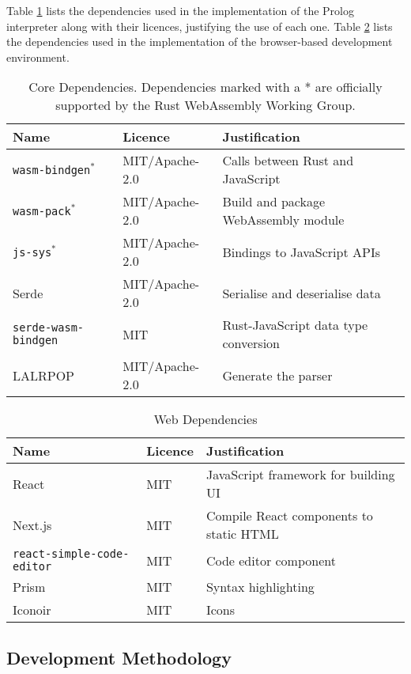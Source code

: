 Table \ref{tab:core-dependencies} lists the dependencies used in the implementation of the Prolog interpreter along with their licences, justifying the use of each one. Table \ref{tab:web-dependencies} lists the dependencies used in the implementation of the browser-based development environment.

\begin{table}[H]
\centering
\begin{tabular}{lll}
\hline
\textbf{Name} & \textbf{Licence} & \textbf{Justification} \\
\hline
\texttt{wasm-bindgen}$^*$ & MIT/Apache-2.0 & Calls between Rust and JavaScript \\
\texttt{wasm-pack}$^*$ & MIT/Apache-2.0 & Build and package WebAssembly module \\
\texttt{js-sys}$^*$ & MIT/Apache-2.0 & Bindings to JavaScript APIs \\
Serde & MIT/Apache-2.0 & Serialise and deserialise data \\
\texttt{serde-wasm-bindgen} & MIT & Rust-JavaScript data type conversion \\
LALRPOP & MIT/Apache-2.0 & Generate the parser \\
\hline
\end{tabular}
\caption{Core Dependencies. Dependencies marked with a * are officially supported by the Rust WebAssembly Working Group.}
\label{tab:core-dependencies}
\end{table}

\begin{table}[H]
\centering
\begin{tabular}{lll}
\hline
\textbf{Name} & \textbf{Licence} & \textbf{Justification} \\
\hline
React & MIT & JavaScript framework for building UI \\
Next.js & MIT & Compile React components to static HTML \\
\texttt{react-simple-code-editor} & MIT & Code editor component \\
Prism & MIT & Syntax highlighting \\
Iconoir & MIT & Icons \\
\hline
\end{tabular}
\caption{Web Dependencies}
\label{tab:web-dependencies}
\end{table}

\subsection{Development Methodology}

